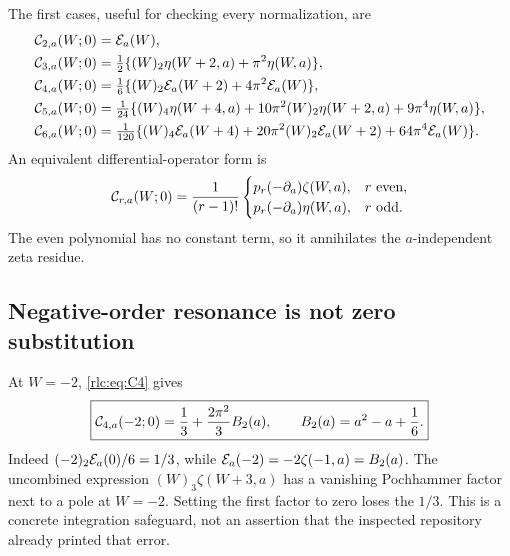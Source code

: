 The first cases, useful for checking every normalization, are
\begin{align}
 \mathcal C_{2,a}(W;0)&=\mathcal E_a(W),\label{rlc:eq:C2}\\
 \mathcal C_{3,a}(W;0)&=\tfrac12\{(W)_2\eta(W+2,a)+\pi^2\eta(W,a)\},
 \label{rlc:eq:C3}\\
 \mathcal C_{4,a}(W;0)&=\tfrac16\{(W)_2\mathcal E_a(W+2)+4\pi^2\mathcal E_a(W)\},
 \label{rlc:eq:C4}\\
 \mathcal C_{5,a}(W;0)&=\tfrac1{24}\{(W)_4\eta(W+4,a)
                +10\pi^2(W)_2\eta(W+2,a)+9\pi^4\eta(W,a)\},
 \label{rlc:eq:C5}\\
 \mathcal C_{6,a}(W;0)&=\tfrac1{120}\{(W)_4\mathcal E_a(W+4)
                +20\pi^2(W)_2\mathcal E_a(W+2)+64\pi^4\mathcal E_a(W)\}.
 \label{rlc:eq:C6}
\end{align}
An equivalent differential-operator form is
\begin{equation}\label{rlc:eq:shiftoperator}
 \mathcal C_{r,a}(W;0)=\frac1{(r-1)!}
 \begin{cases}
 p_r(-\partial_a)\zeta(W,a),&r\text{ even},\\
 p_r(-\partial_a)\eta(W,a),&r\text{ odd}.
 \end{cases}
\end{equation}
The even polynomial has no constant term, so it annihilates the
$a$-independent zeta residue.

\subsection{Negative-order resonance is not zero substitution}
At $W=-2$, \eqref{rlc:eq:C4} gives
\begin{equation}\label{rlc:eq:resonance}
 \boxed{\displaystyle
 \mathcal C_{4,a}(-2;0)=\frac13+\frac{2\pi^2}{3}B_2(a),
 \qquad B_2(a)=a^2-a+\frac16.}
\end{equation}
Indeed $(-2)_2\mathcal E_a(0)/6=1/3$, while
$\mathcal E_a(-2)=-2\zeta(-1,a)=B_2(a)$.
The uncombined expression $(W)_3\zeta(W+3,a)$ has a vanishing
Pochhammer factor next to a pole at $W=-2$. Setting the first factor to
zero loses the $1/3$. This is a concrete integration safeguard, not an
assertion that the inspected repository already printed that error.
